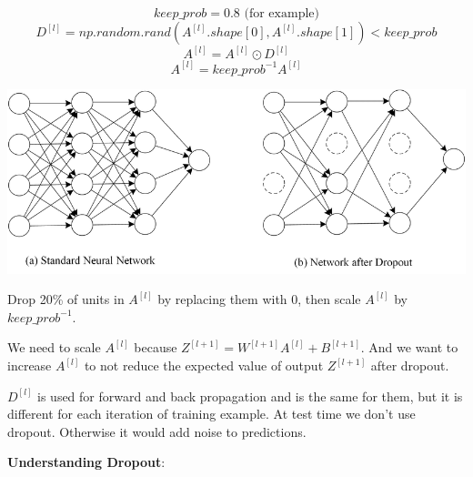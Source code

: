 \documentclass{article}
\begin{document}
\[keep\_prob = 0.8 \text{ (for example)}\]
\[D^{[l]} = np.random.rand(A^{[l]}.shape[0], A^{[l]}.shape[1]) < keep\_prob\]
\[A^{[l]} = A^{[l]} \odot D^{[l]}\]
\[A^{[l]} = keep\_prob^{-1} A^{[l]}\]

\begin{center}
\includegraphics[scale=0.4]{./images/dropout_neural_network.png}
\end{center}

\noindent Drop 20\% of units in \(A^{[l]}\) by replacing them with 0, then scale \(A^{[l]}\) by \(keep\_prob^{-1}\). 

\bigskip

\noindent We need to scale \(A^{[l]}\) because \(Z^{[l + 1]} = W^{[l + 1]} A^{[l]} + B^{[l + 1]}\). And we want to increase \(A^{[l]}\) to not reduce the expected value of output \(Z^{[l + 1]}\) after dropout.

\bigskip

\noindent \(D^{[l]}\) is used for forward and back propagation and is the same for them, but it is different for each iteration of training example. At test time we don't use dropout. Otherwise it would add noise to predictions.

\bigskip

\noindent \textbf{Understanding Dropout}:
\end{document}
